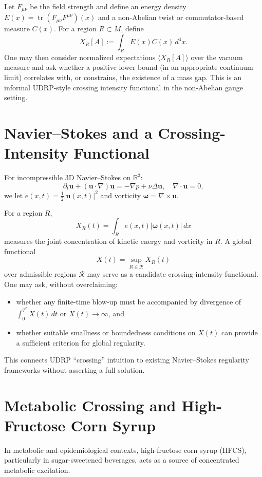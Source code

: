 \documentclass[11pt]{article}
\theoremstyle{definition}
\begin{document}
Let $F_{\mu\nu}$ be the field strength and define an energy density $E(x) = \operatorname{tr}(F_{\mu\nu}F^{\mu\nu})(x)$ and a non-Abelian twist or commutator-based measure $C(x)$.
For a region $R\subset M$, define
\[
X_R[A] := \int_R E(x) C(x)\, d^4x.
\]
One may then consider normalized expectations $\langle X_R[A]\rangle$ over the vacuum measure and ask whether a positive lower bound (in an appropriate continuum limit) correlates with, or constrains, the existence of a mass gap.
This is an informal UDRP-style crossing intensity functional in the non-Abelian gauge setting.

\section{Navier--Stokes and a Crossing-Intensity Functional}

For incompressible 3D Navier--Stokes on $\mathbb{R}^3$:
\[
\partial_t \mathbf{u}
+ (\mathbf{u}\cdot \nabla)\mathbf{u}
= -\nabla p + \nu \Delta \mathbf{u},\quad \nabla\cdot\mathbf{u}=0,
\]
we let $e(x,t) = \tfrac{1}{2}|\mathbf{u}(x,t)|^2$ and vorticity $\bm{\omega} = \nabla\times \mathbf{u}$.

For a region $R$,
\[
X_R(t) = \int_R e(x,t) |\bm{\omega}(x,t)|\, dx
\]
measures the joint concentration of kinetic energy and vorticity in $R$.
A global functional
\[
X(t) = \sup_{R\in\mathcal{R}} X_R(t)
\]
over admissible regions $\mathcal{R}$ may serve as a candidate crossing-intensity functional. One may ask, without overclaiming:

\begin{itemize}
    \item whether any finite-time blow-up must be accompanied by divergence of $\int_0^{T^*} X(t)\,dt$ or $X(t)\to\infty$, and
    \item whether suitable smallness or boundedness conditions on $X(t)$ can provide a sufficient criterion for global regularity.
\end{itemize}

This connects UDRP ``crossing'' intuition to existing Navier--Stokes regularity frameworks without asserting a full solution.

\section{Metabolic Crossing and High-Fructose Corn Syrup}

In metabolic and epidemiological contexts, high-fructose corn syrup (HFCS), particularly in sugar-sweetened beverages, acts as a source of concentrated metabolic excitation.
\end{document}
